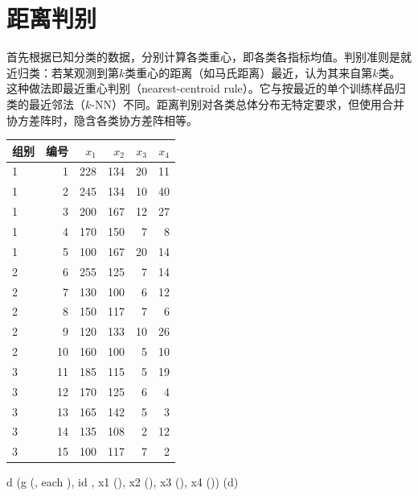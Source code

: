 \section{距离判别}\label{sec:distdisc}
首先根据已知分类的数据，分别计算各类重心，即各类各指标均值。判别准则是就近归类：若某观测到第$k$类重心的距离（如马氏距离）最近，认为其来自第$k$类。这种做法即最近重心判别（nearest-centroid rule）。它与按最近的单个训练样品归类的最近邻法（$k$-NN）不同。距离判别对各类总体分布无特定要求，但使用合并协方差阵时，隐含各类协方差阵相等。
\par\addvspace{5pt}\begin{center}\begin{minipage}{\linewidth}\raggedright
{}
\centering
\small
{}\label{tab:gastric}
\begin{tabular}{lrrrrr}\toprule
{\bfseries 组别 }&{\bfseries  编号 }&{\bfseries  $x_1$ }&{\bfseries  $x_2$ }&{\bfseries  $x_3$ }&{\bfseries  $x_4$}\\\midrule
1 & 1 & 228 & 134 & 20 & 11\\
1 & 2 & 245 & 134 & 10 & 40\\
1 & 3 & 200 & 167 & 12 & 27\\
1 & 4 & 170 & 150 & 7 & 8\\
1 & 5 & 100 & 167 & 20 & 14\\
2 & 6 & 255 & 125 & 7 & 14\\
2 & 7 & 130 & 100 & 6 & 12\\
2 & 8 & 150 & 117 & 7 & 6\\
2 & 9 & 120 & 133 & 10 & 26\\
2 & 10 & 160 & 100 & 5 & 10\\
3 & 11 & 185 & 115 & 5 & 19\\
3 & 12 & 170 & 125 & 6 & 4\\
3 & 13 & 165 & 142 & 5 & 3\\
3 & 14 & 135 & 108 & 2 & 12\\
3 & 15 & 100 & 117 & 7 & 2\\
\bottomrule\end{tabular}
\end{minipage}\end{center}
\begin{code}
d \ROperator{<-} (g \ROperator{=} (\ROperator{:}, each \ROperator{=} ), id \ROperator{=} \ROperator{:},
  x1 \ROperator{=} (),
  x2 \ROperator{=} (),
  x3 \ROperator{=} (),
  x4 \ROperator{=} ())
(d)                       
\end{code}

